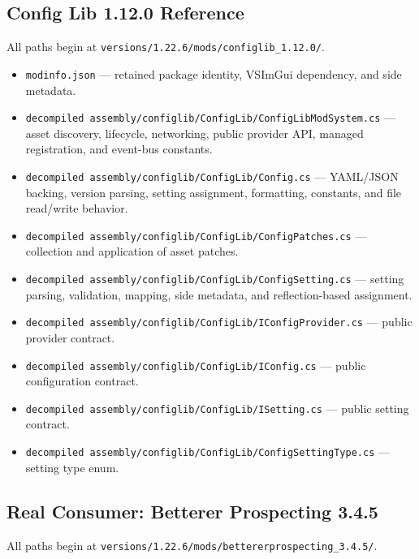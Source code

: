 \documentclass[
  11pt,
  letterpaper,
  titlepage]{article}
\providecommand{\tightlist}{%
  \setlength{\itemsep}{0pt}\setlength{\parskip}{0pt}}
\begin{document}
\subsection{Config Lib 1.12.0
Reference}\label{config-lib-1.12.0-reference}

All paths begin at \texttt{versions/1.22.6/mods/configlib\_1.12.0/}.

\begin{itemize}
\tightlist
\item
  \texttt{modinfo.json} --- retained package identity, VSImGui
  dependency, and side metadata.
\item
  \texttt{decompiled\ assembly/configlib/ConfigLib/ConfigLibModSystem.cs}
  --- asset discovery, lifecycle, networking, public provider API,
  managed registration, and event-bus constants.
\item
  \texttt{decompiled\ assembly/configlib/ConfigLib/Config.cs} ---
  YAML/JSON backing, version parsing, setting assignment, formatting,
  constants, and file read/write behavior.
\item
  \texttt{decompiled\ assembly/configlib/ConfigLib/ConfigPatches.cs} ---
  collection and application of asset patches.
\item
  \texttt{decompiled\ assembly/configlib/ConfigLib/ConfigSetting.cs} ---
  setting parsing, validation, mapping, side metadata, and
  reflection-based assignment.
\item
  \texttt{decompiled\ assembly/configlib/ConfigLib/IConfigProvider.cs}
  --- public provider contract.
\item
  \texttt{decompiled\ assembly/configlib/ConfigLib/IConfig.cs} ---
  public configuration contract.
\item
  \texttt{decompiled\ assembly/configlib/ConfigLib/ISetting.cs} ---
  public setting contract.
\item
  \texttt{decompiled\ assembly/configlib/ConfigLib/ConfigSettingType.cs}
  --- setting type enum.
\end{itemize}

\subsection{Real Consumer: Betterer Prospecting
3.4.5}\label{real-consumer-betterer-prospecting-3.4.5}

All paths begin at
\texttt{versions/1.22.6/mods/bettererprospecting\_3.4.5/}.
\end{document}
